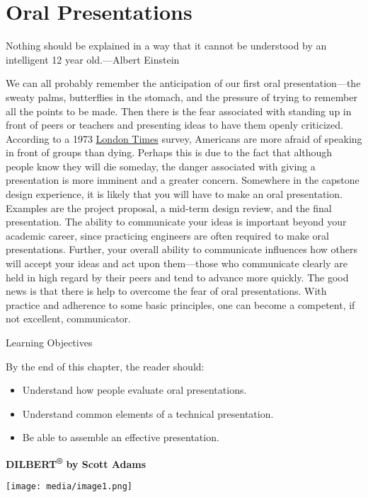 \section{\texorpdfstring{ Oral
Presentations}{ Oral Presentations}}\label{oral-presentations}

Nothing should be explained in a way that it cannot be understood by an
intelligent 12 year old.---Albert Einstein

We can all probably remember the anticipation of our first oral
presentation---the sweaty palms, butterflies in the stomach, and the
pressure of trying to remember all the points to be made. Then there is
the fear associated with standing up in front of peers or teachers and
presenting ideas to have them openly criticized. According to a 1973
\ul{London Times} survey, Americans are more afraid of speaking in front
of groups than dying. Perhaps this is due to the fact that although
people know they will die someday, the danger associated with giving a
presentation is more imminent and a greater concern. Somewhere in the
capstone design experience, it is likely that you will have to make an
oral presentation. Examples are the project proposal, a mid-term design
review, and the final presentation. The ability to communicate your
ideas is important beyond your academic career, since practicing
engineers are often required to make oral presentations. Further, your
overall ability to communicate influences how others will accept your
ideas and act upon them---those who communicate clearly are held in high
regard by their peers and tend to advance more quickly. The good news is
that there is help to overcome the fear of oral presentations. With
practice and adherence to some basic principles, one can become a
competent, if not excellent, communicator.

Learning Objectives

By the end of this chapter, the reader should:

\begin{itemize}
\item
  Understand how people evaluate oral presentations.
\item
  Understand common elements of a technical presentation.
\item
  Be able to assemble an effective presentation.
\end{itemize}

\textbf{\hfill\break
DILBERT\textsuperscript{®} by Scott Adams}

\texttt{[image: media/image1.png]}

